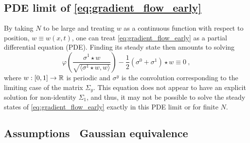 \subsection{PDE limit of \cref{eq:gradient_flow_early}}
\label{sec:pde-limit}

By taking $N$ to be large and treating $w$ as a continuous function with respect to position, \ie $w \equiv w(x, t)$, one can treat \cref{eq:gradient_flow_early} as a partial differential equation (PDE). 
Finding its steady state then amounts to solving
\begin{equation}
    \varphi\left( \frac{\sigma^1 \star w}{\sqrt{ \langle \sigma^1 \star w, w \rangle}} \right) - \frac{1}{2} (\sigma^0 + \sigma^1) \star w \equiv 0~,
\end{equation}
where $w : [0,1] \to \operatorname{\mathbb{R}}$ is periodic and $\sigma^y$ is the convolution corresponding to the limiting case of the matrix $\Sigma_y$.
This equation does not appear to have an explicit solution for non-identity $\Sigma_1$,
and thus, it may not be possible to solve the steady states of \cref{eq:gradient_flow_early} exactly in this PDE limit or for finite $N$.

\subsection{Assumptions~
\vs Gaussian equivalence}


